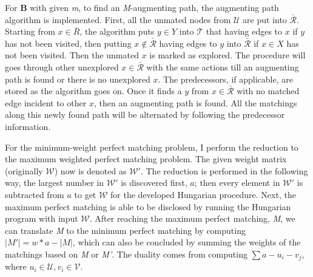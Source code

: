 \documentclass[11pt]{article}
\begin{document}
For $\mathbf{B}$ with given \emph{m}, to find an \emph{M}-augmenting path, the augmenting path algorithm is implemented. First, all the unmated nodes from $\mathcal{U}$ are put into $\mathcal{\bar{R}}$. Starting from $x\in\bar{R}$, the algorithm puts $y\in Y$ into $\mathcal{T}$ that having edges to $x$ if $y$ has not been visited, then putting $x\not\in\mathcal{\bar{R}}$ having edges to $y$ into $\mathcal{\bar{R}}$ if $x\in X$ has not been visited. Then the unmated $x$ is marked as explored. The procedure will goes through other unexplored $x\in\mathcal{\bar{R}}$ with the same actions till an augmenting path is found or there is no unexplored $x$. The predecessors, if applicable, are stored as the algorithm goes on. Once it finds a $y$ from $x\in\mathcal{\bar{R}}$ with no matched edge incident to other $x$, then an augmenting path is found. All the matchings along this newly found path will be alternated by following the predecessor information.%

For the minimum-weight perfect matching problem, I perform the reduction to the maximum weighted perfect matching problem. The given weight matrix (originally $\mathcal{W}$) now is denoted as $\mathcal{W'}$. The reduction is performed in the following way, the largest number in $\mathcal{W'}$ is discovered first, $a$; then every element in $\mathcal{W'}$ is subtracted from $a$ to get $\mathcal{W}$ for the developed Hungarian procedure. Next, the maximum perfect matching is able to be disclosed by running the Hungarian program with input $\mathcal{W}$. After reaching the maximum perfect matching, \emph{M}, we can translate \emph{M} to the minimum perfect matching by computing $|M'|=w*a-|M|$, which can also be concluded by summing the weights of the matchings based on \emph{M} or \emph{M'}. The duality comes from computing $\sum{{a-u_i}-v_j}$, where $u_i\in\mathcal{U}, v_i\in\mathcal{V}$.
\end{document}
